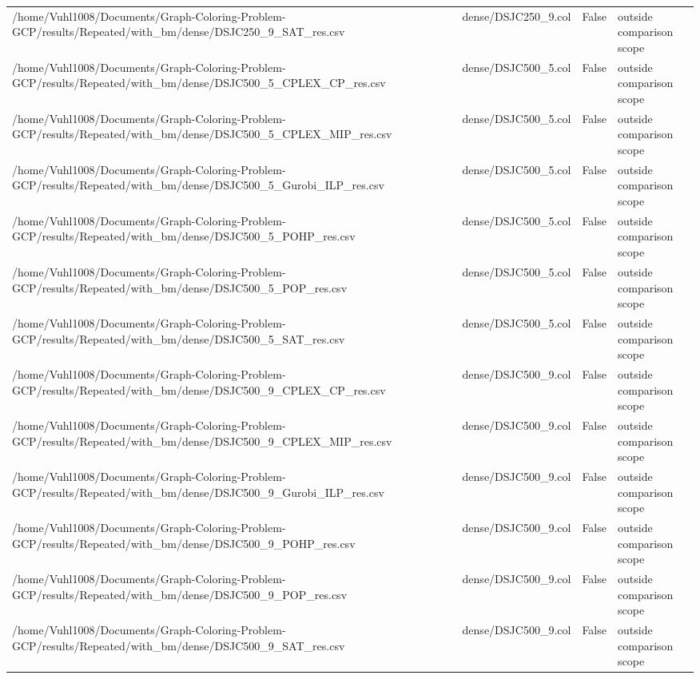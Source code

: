 \begin{table}[htbp]
\begin{tabular}{llll}
/home/Vuhl1008/Documents/Graph-Coloring-Problem-GCP/results/Repeated/with\_bm/dense/DSJC250\_9\_SAT\_res.csv & dense/DSJC250\_9.col & False & outside comparison scope \\
/home/Vuhl1008/Documents/Graph-Coloring-Problem-GCP/results/Repeated/with\_bm/dense/DSJC500\_5\_CPLEX\_CP\_res.csv & dense/DSJC500\_5.col & False & outside comparison scope \\
/home/Vuhl1008/Documents/Graph-Coloring-Problem-GCP/results/Repeated/with\_bm/dense/DSJC500\_5\_CPLEX\_MIP\_res.csv & dense/DSJC500\_5.col & False & outside comparison scope \\
/home/Vuhl1008/Documents/Graph-Coloring-Problem-GCP/results/Repeated/with\_bm/dense/DSJC500\_5\_Gurobi\_ILP\_res.csv & dense/DSJC500\_5.col & False & outside comparison scope \\
/home/Vuhl1008/Documents/Graph-Coloring-Problem-GCP/results/Repeated/with\_bm/dense/DSJC500\_5\_POHP\_res.csv & dense/DSJC500\_5.col & False & outside comparison scope \\
/home/Vuhl1008/Documents/Graph-Coloring-Problem-GCP/results/Repeated/with\_bm/dense/DSJC500\_5\_POP\_res.csv & dense/DSJC500\_5.col & False & outside comparison scope \\
/home/Vuhl1008/Documents/Graph-Coloring-Problem-GCP/results/Repeated/with\_bm/dense/DSJC500\_5\_SAT\_res.csv & dense/DSJC500\_5.col & False & outside comparison scope \\
/home/Vuhl1008/Documents/Graph-Coloring-Problem-GCP/results/Repeated/with\_bm/dense/DSJC500\_9\_CPLEX\_CP\_res.csv & dense/DSJC500\_9.col & False & outside comparison scope \\
/home/Vuhl1008/Documents/Graph-Coloring-Problem-GCP/results/Repeated/with\_bm/dense/DSJC500\_9\_CPLEX\_MIP\_res.csv & dense/DSJC500\_9.col & False & outside comparison scope \\
/home/Vuhl1008/Documents/Graph-Coloring-Problem-GCP/results/Repeated/with\_bm/dense/DSJC500\_9\_Gurobi\_ILP\_res.csv & dense/DSJC500\_9.col & False & outside comparison scope \\
/home/Vuhl1008/Documents/Graph-Coloring-Problem-GCP/results/Repeated/with\_bm/dense/DSJC500\_9\_POHP\_res.csv & dense/DSJC500\_9.col & False & outside comparison scope \\
/home/Vuhl1008/Documents/Graph-Coloring-Problem-GCP/results/Repeated/with\_bm/dense/DSJC500\_9\_POP\_res.csv & dense/DSJC500\_9.col & False & outside comparison scope \\
/home/Vuhl1008/Documents/Graph-Coloring-Problem-GCP/results/Repeated/with\_bm/dense/DSJC500\_9\_SAT\_res.csv & dense/DSJC500\_9.col & False & outside comparison scope \\

\end{tabular}
\end{table}

